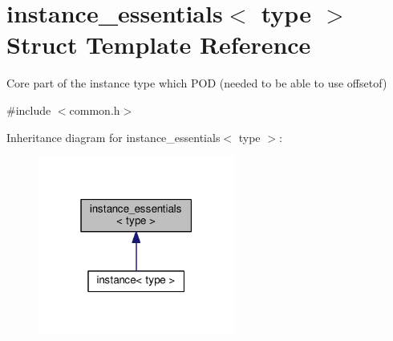 \hypertarget{structinstance__essentials}{}\section{instance\+\_\+essentials$<$ type $>$ Struct Template Reference}
\label{structinstance__essentials}


Core part of the \textquotesingle{}instance\textquotesingle{} type which P\+OD (needed to be able to use \textquotesingle{}offsetof\textquotesingle{})  




{\ttfamily \#include $<$common.\+h$>$}



Inheritance diagram for instance\+\_\+essentials$<$ type $>$\+:
\nopagebreak
\begin{figure}[H]
\begin{center}
\leavevmode
\includegraphics[width=183pt]{structinstance__essentials__inherit__graph}
\end{center}
\end{figure}
